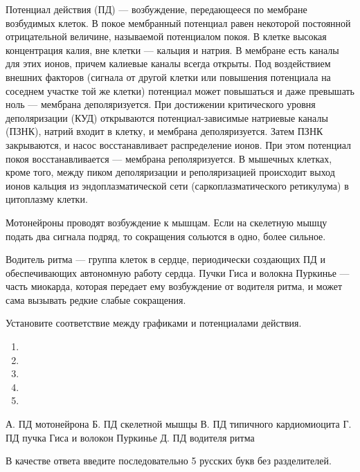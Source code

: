 
Потенциал действия (ПД) — возбуждение, передающееся по мембране возбудимых клеток. В покое мембранный потенциал равен некоторой постоянной отрицательной величине, называемой потенциалом покоя. В клетке высокая концентрация калия, вне клетки — кальция и натрия. В мембране есть каналы для этих ионов, причем калиевые каналы всегда открыты. Под воздействием внешних факторов (сигнала от другой клетки или повышения потенциала на соседнем участке той же клетки) потенциал может повышаться и даже превышать ноль — мембрана деполяризуется. При достижении критического уровня деполяризации (КУД) открываются потенциал-зависимые натриевые каналы (ПЗНК), натрий входит в клетку, и мембрана деполяризуется. Затем ПЗНК закрываются, и насос восстанавливает распределение ионов. При этом потенциал покоя восстанавливается — мембрана реполяризуется. В мышечных клетках, кроме того, между пиком деполяризации и реполяризацией происходит выход ионов кальция из эндоплазматической сети (саркоплазматического ретикулума) в цитоплазму клетки.

Мотонейроны проводят возбуждение к мышцам. Если на скелетную мышцу подать два сигнала подряд, то сокращения сольются в одно, более сильное.

Водитель ритма — группа клеток в сердце, периодически создающих ПД и обеспечивающих автономную работу сердца. Пучки Гиса и волокна Пуркинье — часть миокарда, которая передает ему возбуждение от водителя ритма, и может сама вызывать редкие слабые сокращения.

Установите соответствие между графиками и потенциалами действия.

\begin{enumerate}
\item {}
\item {}
\item {}
\item {}
\item {}
\end{enumerate}

А. ПД мотонейрона
Б. ПД скелетной мышцы
В. ПД типичного кардиомиоцита
Г. ПД пучка Гиса и волокон Пуркинье
Д. ПД водителя ритма

В качестве ответа введите последовательно 5 русских букв без разделителей.